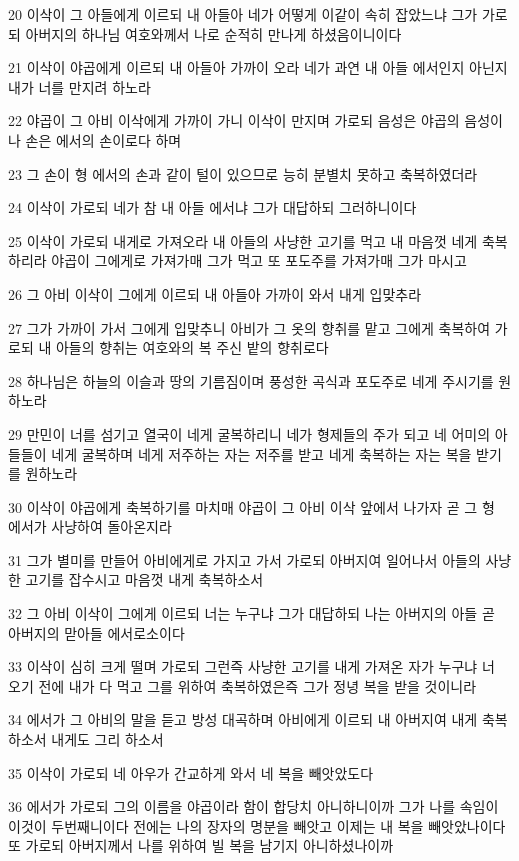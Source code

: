 \par 20 이삭이 그 아들에게 이르되 내 아들아 네가 어떻게 이같이 속히 잡았느냐 그가 가로되 아버지의 하나님 여호와께서 나로 순적히 만나게 하셨음이니이다
\par 21 이삭이 야곱에게 이르되 내 아들아 가까이 오라 네가 과연 내 아들 에서인지 아닌지 내가 너를 만지려 하노라
\par 22 야곱이 그 아비 이삭에게 가까이 가니 이삭이 만지며 가로되 음성은 야곱의 음성이나 손은 에서의 손이로다 하며
\par 23 그 손이 형 에서의 손과 같이 털이 있으므로 능히 분별치 못하고 축복하였더라
\par 24 이삭이 가로되 네가 참 내 아들 에서냐 그가 대답하되 그러하니이다
\par 25 이삭이 가로되 내게로 가져오라 내 아들의 사냥한 고기를 먹고 내 마음껏 네게 축복하리라 야곱이 그에게로 가져가매 그가 먹고 또 포도주를 가져가매 그가 마시고
\par 26 그 아비 이삭이 그에게 이르되 내 아들아 가까이 와서 내게 입맞추라
\par 27 그가 가까이 가서 그에게 입맞추니 아비가 그 옷의 향취를 맡고 그에게 축복하여 가로되 내 아들의 향취는 여호와의 복 주신 밭의 향취로다
\par 28 하나님은 하늘의 이슬과 땅의 기름짐이며 풍성한 곡식과 포도주로 네게 주시기를 원하노라
\par 29 만민이 너를 섬기고 열국이 네게 굴복하리니 네가 형제들의 주가 되고 네 어미의 아들들이 네게 굴복하며 네게 저주하는 자는 저주를 받고 네게 축복하는 자는 복을 받기를 원하노라
\par 30 이삭이 야곱에게 축복하기를 마치매 야곱이 그 아비 이삭 앞에서 나가자 곧 그 형 에서가 사냥하여 돌아온지라
\par 31 그가 별미를 만들어 아비에게로 가지고 가서 가로되 아버지여 일어나서 아들의 사냥한 고기를 잡수시고 마음껏 내게 축복하소서
\par 32 그 아비 이삭이 그에게 이르되 너는 누구냐 그가 대답하되 나는 아버지의 아들 곧 아버지의 맏아들 에서로소이다
\par 33 이삭이 심히 크게 떨며 가로되 그런즉 사냥한 고기를 내게 가져온 자가 누구냐 너 오기 전에 내가 다 먹고 그를 위하여 축복하였은즉 그가 정녕 복을 받을 것이니라
\par 34 에서가 그 아비의 말을 듣고 방성 대곡하며 아비에게 이르되 내 아버지여 내게 축복하소서 내게도 그리 하소서
\par 35 이삭이 가로되 네 아우가 간교하게 와서 네 복을 빼앗았도다
\par 36 에서가 가로되 그의 이름을 야곱이라 함이 합당치 아니하니이까 그가 나를 속임이 이것이 두번째니이다 전에는 나의 장자의 명분을 빼앗고 이제는 내 복을 빼앗았나이다 또 가로되 아버지께서 나를 위하여 빌 복을 남기지 아니하셨나이까

